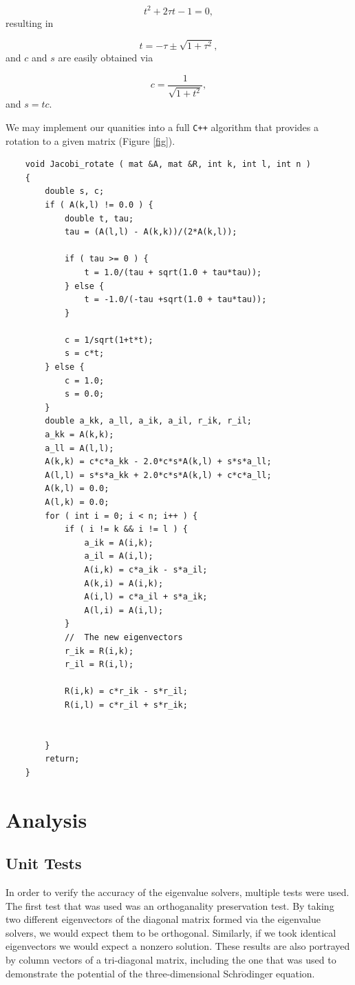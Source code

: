 \documentclass[%
reprint,
superscriptaddress,
showpacs,
nofootinbib,
bibnotes,amsmath,amssymb,aps,
prc, 
]{revtex4-1}
\begin{document}
\begin{equation*}
	t^2+2\tau t-1= 0,
\end{equation*}
resulting in

\begin{equation*}
	t = -\tau \pm \sqrt{1+\tau^2},
\end{equation*}
and $c$ and $s$ are easily obtained via

\begin{equation*}
	c = \frac{1}{\sqrt{1+t^2}},
\end{equation*}
and $s=tc$. 

We may implement our quanities into a full \verb|C++| algorithm that provides a rotation to a given matrix (Figure \ref{fig}).

\begin{lstlisting}
	void Jacobi_rotate ( mat &A, mat &R, int k, int l, int n )
	{
		double s, c;
		if ( A(k,l) != 0.0 ) {
			double t, tau;
			tau = (A(l,l) - A(k,k))/(2*A(k,l));
			
			if ( tau >= 0 ) {
				t = 1.0/(tau + sqrt(1.0 + tau*tau));
			} else {
				t = -1.0/(-tau +sqrt(1.0 + tau*tau));
			}
			
			c = 1/sqrt(1+t*t);
			s = c*t;
		} else {
			c = 1.0;
			s = 0.0;
		}
		double a_kk, a_ll, a_ik, a_il, r_ik, r_il;
		a_kk = A(k,k);
		a_ll = A(l,l);
		A(k,k) = c*c*a_kk - 2.0*c*s*A(k,l) + s*s*a_ll;
		A(l,l) = s*s*a_kk + 2.0*c*s*A(k,l) + c*c*a_ll;
		A(k,l) = 0.0;
		A(l,k) = 0.0;
		for ( int i = 0; i < n; i++ ) {
			if ( i != k && i != l ) {
				a_ik = A(i,k);
				a_il = A(i,l);
				A(i,k) = c*a_ik - s*a_il;
				A(k,i) = A(i,k);
				A(i,l) = c*a_il + s*a_ik;
				A(l,i) = A(i,l);
			}
			//  The new eigenvectors
			r_ik = R(i,k);
			r_il = R(i,l);
			
			R(i,k) = c*r_ik - s*r_il;
			R(i,l) = c*r_il + s*r_ik;
			
			
		}
		return;
	}
\end{lstlisting}


	\section{Analysis}
	
	\subsection{Unit Tests}
	In order to verify the accuracy of the eigenvalue solvers, multiple tests were used.  The first test that was used was an orthoganality preservation test.  By taking two different eigenvectors of the diagonal matrix formed via the eigenvalue solvers, we would expect them to be orthogonal.  Similarly, if we took identical eigenvectors we would expect a nonzero solution.  These results are also portrayed by column vectors of a tri-diagonal matrix, including the one that was used to demonstrate the potential of the three-dimensional Schr$\ddot{\textrm{o}}$dinger equation.
	
\end{document}
